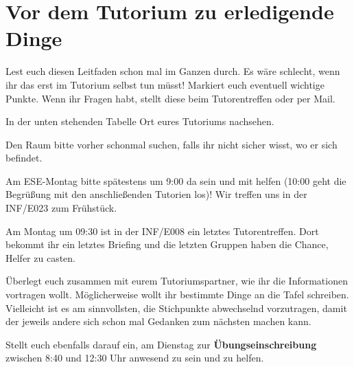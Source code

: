 \documentclass[a4paper,12pt]{report}
\begin{document}
\section{Vor dem Tutorium zu erledigende Dinge}
\begin{itemize*}
\item Lest euch diesen Leitfaden schon mal im Ganzen durch.
Es wäre schlecht, wenn ihr das erst im Tutorium selbst tun müsst!
Markiert euch eventuell wichtige Punkte.
Wenn ihr Fragen habt, stellt diese beim Tutorentreffen oder per Mail.
\item In der unten stehenden Tabelle Ort eures Tutoriums nachsehen.
\item Den Raum bitte vorher schonmal suchen, falls ihr nicht sicher wisst, wo er sich befindet.
\item Am ESE-Montag bitte spätestens um 9:00 da sein und mit helfen (10:00 geht die Begrüßung mit den anschließenden Tutorien los)!
Wir treffen uns in der INF/E023 zum Frühstück.
\item Am Montag um 09:30 ist in der INF/E008 ein letztes Tutorentreffen.
Dort bekommt ihr ein letztes Briefing  und die letzten Gruppen haben die Chance, Helfer zu casten.
\item Überlegt euch zusammen mit eurem Tutoriumspartner, wie ihr die Informationen vortragen wollt.
Möglicherweise wollt ihr bestimmte Dinge an die Tafel schreiben.
Vielleicht ist es am sinnvollsten, die Stichpunkte abwechselnd vorzutragen, damit der jeweils andere sich schon mal Gedanken zum nächsten machen kann.
\item Stellt euch ebenfalls darauf ein, am Dienstag zur \textbf{Übungseinschreibung} zwischen 8:40 und 12:30 Uhr anwesend zu sein und zu helfen.
\end{itemize*}
\end{document}
